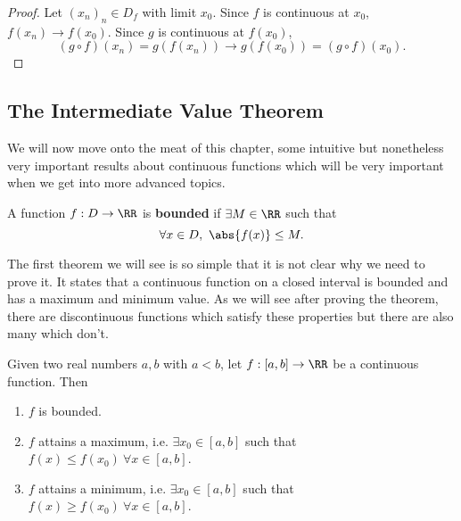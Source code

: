 \documentclass[../real_analysis.tex]{subfiles}
\begin{document}
            \begin{proof}
                Let $(x_n)_n\in D_f$ with limit $x_0$. Since $f$ is continuous at $x_0$, $f(x_n)\to f(x_0)$. Since $g$ is continuous at $f(x_0)$,
                \begin{equation}
                    (g\circ f)(x_n)=g(f(x_n))\to g(f(x_0))=(g\circ f)(x_0).
                \end{equation}
            \end{proof}

        \subsection{The Intermediate Value Theorem}\label{subsec:intermediate-value-theorem}
            We will now move onto the meat of this chapter, some intuitive but nonetheless very important results about continuous functions which will be very important when we get into more advanced topics.
            \begin{definition}
                A function $f: D\to\RR$ is \textbf{bounded} if $\exists M\in\RR$ such that
                \begin{equation}
                    \forall x\in D,\ \abs{f(x)}\leq M.
                \end{equation}
            \end{definition}
            The first theorem we will see is so simple that it is not clear why we need to prove it. It states that a continuous function on a closed interval is bounded and has a maximum and minimum value. As we will see after proving the theorem, there are discontinuous functions which satisfy these properties but there are also many which don't.
            \begin{theorem}\label{thm:evt}
                Given two real numbers $a, b$ with $a<b$, let $f: [a, b]\to\RR$ be a continuous function. Then
                \begin{enumerate}[label={\upshape(\roman*)}]
                    \item $f$ is bounded.
                    \item $f$ attains a maximum, i.e. $\exists x_0\in[a,b]$ such that $f(x)\leq f(x_0)\ \forall x\in[a,b]$.
                    \item $f$ attains a minimum, i.e. $\exists x_0\in[a,b]$ such that $f(x)\geq f(x_0)\ \forall x\in[a,b]$.
                \end{enumerate}
            \end{theorem}
\end{document}
